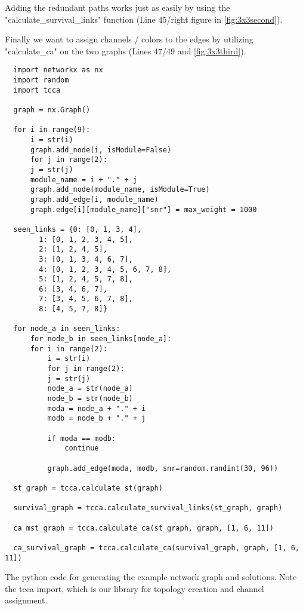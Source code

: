     Adding the redundant paths works just as easily by using the "calculate\_survival\_links" function (Line 45/right figure in \ref{fig:3x3second}).
    
    Finally we want to assign channels / colors to the edges by utilizing "calculate\_ca" on the two graphs (Lines 47/49 and \ref{fig:3x3third}).
    
    \newpage
    
    \begin{table}[h!]
    \lstset{language=Python}
    \begin{lstlisting}
  import networkx as nx
  import random
  import tcca

  graph = nx.Graph()

  for i in range(9):
      i = str(i)
      graph.add_node(i, isModule=False)
      for j in range(2):
	  j = str(j)
	  module_name = i + "." + j
	  graph.add_node(module_name, isModule=True)
	  graph.add_edge(i, module_name)
	  graph.edge[i][module_name]["snr"] = max_weight = 1000

  seen_links = {0: [0, 1, 3, 4], 
		1: [0, 1, 2, 3, 4, 5], 
		2: [1, 2, 4, 5], 
		3: [0, 1, 3, 4, 6, 7], 
		4: [0, 1, 2, 3, 4, 5, 6, 7, 8], 
		5: [1, 2, 4, 5, 7, 8], 
		6: [3, 4, 6, 7], 
		7: [3, 4, 5, 6, 7, 8], 
		8: [4, 5, 7, 8]}

  for node_a in seen_links:
      for node_b in seen_links[node_a]:
	  for i in range(2):
	      i = str(i)
	      for j in range(2):
		  j = str(j)
		  node_a = str(node_a)
		  node_b = str(node_b)
		  moda = node_a + "." + i
		  modb = node_b + "." + j

		  if moda == modb:
		      continue

		  graph.add_edge(moda, modb, snr=random.randint(30, 96))

  st_graph = tcca.calculate_st(graph)

  survival_graph = tcca.calculate_survival_links(st_graph, graph)

  ca_mst_graph = tcca.calculate_ca(st_graph, graph, [1, 6, 11])

  ca_survival_graph = tcca.calculate_ca(survival_graph, graph, [1, 6, 11])
    \end{lstlisting}
    \caption{The python code for generating the example network graph and solutions. Note the tcca import, 
      which is our library for topology creation and channel assignment.}
    \label{tab:python-example}
  \end{table}
  
  \newpage
  
